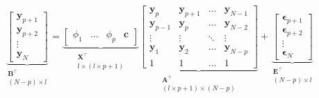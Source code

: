 \begin{equation}
 \label{eq:varmatrix}
               \underbrace{ \left[ \begin{array}{c}
                \mathbf{y}_{p+1} \\
                \mathbf{y}_{p+2} \\
                \vdots           \\
                \mathbf{y}_N  
               \end{array} \right]  }_{\substack{ \mathbf{B}^\top\\ (N-p) \times l}}   
= 
\underbrace{
  \begin{bmatrix}
    \phi_1 & \dots & \phi_p & \mathbf{c}   
  \end{bmatrix}}_{\substack{ \mathbf{X}^\top\\ l \times  (l \times p+1)}}
\underbrace{\begin{bmatrix}
   \mathbf{y}_p     & \mathbf{y}_{p+1}  & \dots     & \mathbf{y}_{N-1}\\
   \mathbf{y}_{p-1} & \mathbf{y}_{p}  & \dots     & \mathbf{y}_{N-2} \\
   \vdots           & \vdots            & \ddots    & \vdots  \\
   \mathbf{y}_{1}   & \mathbf{y}_{2}& \dots      & \mathbf{y}_{N-p} \\
   1                &  1                & \dots      &             1 
   \end{bmatrix}}_{\substack{ \mathbf{A}^\top\\  (l \times p+1) \times (N-p)}}
+
\underbrace{\begin{bmatrix}
              \mathbf{\epsilon}_{p+1}  \\ 
              \mathbf{\epsilon}_{p+2}  \\ 
               \vdots                 \\
              \mathbf{\epsilon}_N     
             \end{bmatrix}}_{\substack{\mathbf{E}^\top\\ (N-p) \times l }} 
\end{equation}


